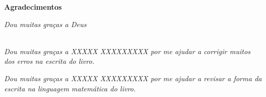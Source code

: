 \cleardoublepage

\begin{center}
\Huge{\textbf{Agradecimentos}}
\end{center}

\null
\vfill
\thispagestyle{empty}

{\normalsize \it \hfill Dou muitas graças a Deus \vspace*{4pt}}


~\\

{\normalsize \it Dou muitas graças a XXXXX XXXXXXXXX por me 
ajudar a corrigir muitos dos erros na escrita do livro.
\vspace*{4pt}}

{\normalsize \it Dou muitas graças a XXXXX XXXXXXXXX por me 
ajudar a revisar a forma da escrita na linguagem matemática do livro.
\vspace*{4pt}}

\begin{comment}
{\normalsize \it Dou muitas graças a XXXXX XXXXXXXXX por me 
ajudar a resolver muitas duvidas sobre definições e uso de termos na XXXXXXX XXXXXXX.
\vspace*{4pt}}
\end{comment}

\begin{comment}
{\normalsize \it Dou muitas graças a XXXXX XXXXXXXXX pela 
suas sugestões e revisão  do capitulo XXXXX XXXXXXXXX.
\vspace*{4pt}}
\end{comment}


